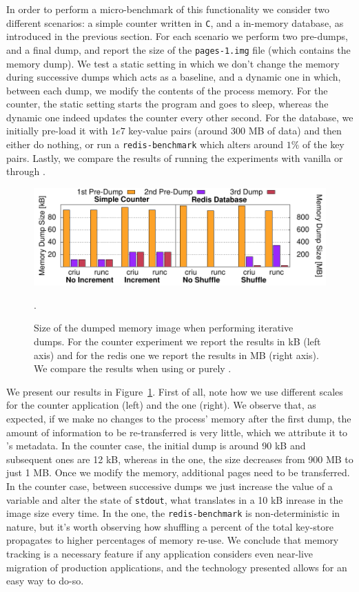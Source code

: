 In order to perform a micro-benchmark of this functionality we consider two different scenarios: a simple counter written in \texttt{C}, and a \redis in-memory database, as introduced in the previous section.
For each scenario we perform two pre-dumps, and a final dump, and report the size of the \texttt{pages-1.img} file (which contains the memory dump).
We test a static setting in which we don't change the memory during successive dumps which acts as a baseline, and a dynamic one in which, between each dump, we modify the contents of the process memory.
For the counter, the static setting starts the program and goes to sleep, whereas the dynamic one indeed updates the counter every other second.
For the database, we initially pre-load it with $1e7$ key-value pairs (around 300 MB of data) and then either do nothing, or run a \texttt{redis-benchmark} which alters around $1\%$ of the key pairs.
Lastly, we compare the results of running the experiments with vanilla \criu or through \runc.

\begin{figure}[h!]
    \centering
    \includegraphics[width=.8\textwidth]{figs/iterative-migration-microbenchmark/iterative_migration_microbenchmark.pdf}
    \caption[Size of the memory image for iterative dumps.]{Size of the dumped memory image when performing iterative dumps. For the counter experiment we report the results in kB (left axis) and for the redis one we report the results in MB (right axis). We compare the results when using \runc or purely \criu.\label{fig:iterative-migration-microbenchmark}}.
\end{figure}

We present our results in Figure~\ref{fig:iterative-migration-microbenchmark}.
First of all, note how we use different scales for the counter application (left) and the \redis one (right).
We observe that, as expected, if we make no changes to the process' memory after the first dump, the amount of information to be re-transferred is very little, which we attribute it to \criu's metadata.
In the counter case, the initial dump is around 90 kB and subsequent ones are 12 kB, whereas in the \redis one, the size decreases from 900 MB to just 1 MB.
Once we modify the memory, additional pages need to be transferred.
In the counter case, between successive dumps we just increase the value of a variable and alter the state of \texttt{stdout}, what translates in a 10 kB inrease in the image size every time.
In the \redis one, the \texttt{redis-benchmark} is non-deterministic in nature, but it's worth observing how shuffling a percent of the total key-store propagates to higher percentages of memory re-use.
We conclude that memory tracking is a necessary feature if any application considers even near-live migration of production applications, and the technology presented allows for an easy way to do-so.


